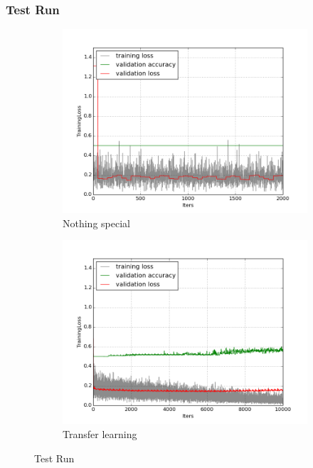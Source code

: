 \documentclass[a4paper,11pt]{article}
\begin{document}
\subsubsection{Test Run}
\begin{figure}
    \centering
    \begin{minipage}[b]{\textwidth}
      \begin{subfigure}{.5\textwidth} 
        \centering
        \includegraphics[scale=0.4]{images/plot_soil_contam_tl_wout.png}
        \caption{Nothing special}\label{fig:2a}
      \end{subfigure}%
      \begin{subfigure}{.5\textwidth} 
        \centering
        \includegraphics[scale=0.4]{images/plot_soil_contam_noneC_long.png}
        \caption{Transfer learning}\label{fig:2b}
      \end{subfigure} \par \vspace*{20pt} %
      \caption{Test Run}\label{fig:2}
    \end{minipage}%
    \label{f54}
\end{figure}
\end{document}
